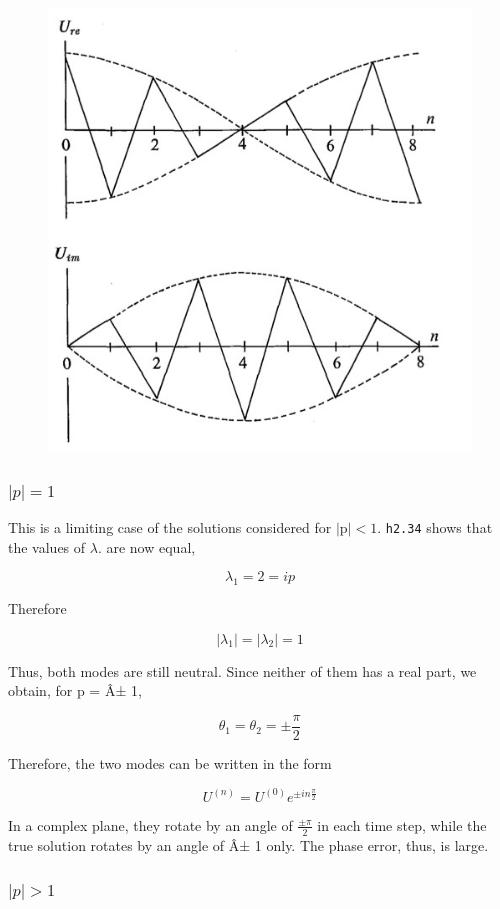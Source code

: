 \begin{figure}
    \centering
    \includegraphics[width = .7 \textwidth]{figs/NM/pic8.jpg}
    \caption{} \label{fig:}
\end{figure}

\subsubsection{\(\left| p \right| = 1\)}\label{subsubsec:left-p-right-1}

This is a limiting case of the solutions considered for
\(\left| \text{p} \right| < 1\). \texttt{h2.34} shows that the values of
\(\lambda\). are now equal,

\[\lambda_{1} = 2 = ip\]

Therefore

\[\left| \lambda_{1} \right| = \left| \lambda_{2} \right| = 1\]

Thus, both modes are still neutral. Since neither of them has a real
part, we obtain, for p = Â± 1,

\[\theta_{1} = \theta_{2} = \pm \frac{\pi}{2}\]

Therefore, the two modes can be written in the form

\[U^{\left( n \right)} = U^{\left( 0 \right)}e^{\pm i n\frac{\pi}{2}}\]

In a complex plane, they rotate by an angle of \(\frac{\pm \pi}{2}\) in
each time step, while the true solution rotates by an angle of Â± 1
only. The phase error, thus, is large.

\subsubsection{\(\left| p \right| > 1\)}\label{subsubsec:p-greater-1}

